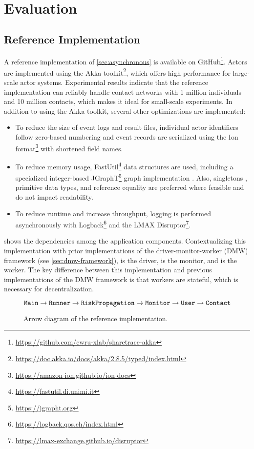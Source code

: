 \chapter{Evaluation}

\section{Reference Implementation}

A reference implementation of \cref{sec:asynchronous} is available on GitHub\footnote{\url{https://github.com/cwru-xlab/sharetrace-akka}}. Actors are implemented using the Akka toolkit\footnote{\url{https://doc.akka.io/docs/akka/2.8.5/typed/index.html}}, which offers high performance for large-scale actor systems. Experimental results indicate that the reference implementation can reliably handle contact networks with 1 million individuals and 10 million contacts, which makes it ideal for small-scale experiments. In addition to using the Akka toolkit, several other optimizations are implemented:
\begin{itemize}
  \item To reduce the size of event logs and result files, individual actor identifiers follow zero-based numbering and event records are serialized using the Ion format\footnote{\url{https://amazon-ion.github.io/ion-docs}} with shortened field names.
  \item To reduce memory usage, FastUtil\footnote{\url{https://fastutil.di.unimi.it}} data structures are used, including a specialized integer-based JGraphT\footnote{\url{https://jgrapht.org}} graph implementation \citep{Michail2020}. Also, singletons \citep{Gamma1995}, primitive data types, and reference equality are preferred where feasible and do not impact readability.
  \item To reduce runtime and increase throughput, logging is performed asynchronously with Logback\footnote{\url{https://logback.qos.ch/index.html}} and the LMAX Disruptor\footnote{\url{https://lmax-exchange.github.io/disruptor}}.
\end{itemize}

 shows the dependencies among the application components. Contextualizing this implementation with prior implementations of the driver-monitor-worker (DMW) framework (see \cref{sec:dmw-framework}),  is the driver,  is the monitor, and  is the worker. The key difference between this implementation and previous implementations of the DMW framework is that workers are stateful, which is necessary for decentralization.
\begin{figure}[htbp]
\begin{equation*}
  \texttt{Main} \rightarrow \texttt{Runner} \rightarrow \texttt{RiskPropagation} \rightarrow \texttt{Monitor} \rightarrow \texttt{User} \rightarrow \texttt{Contact}
\end{equation*}
\caption[Arrow diagram of the reference implementation]{Arrow diagram of the reference implementation.}
\label{fig:arrow-diagram}
\end{figure}

